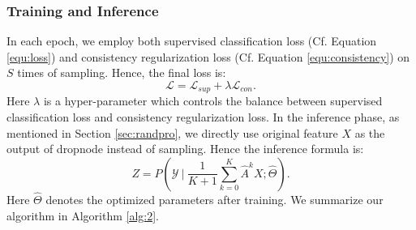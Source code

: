 {\subsubsection{Training and Inference}
In each epoch, we employ both supervised classification loss (Cf. Equation \ref{equ:loss}) and consistency regularization loss (Cf. Equation \ref{equ:consistency}) on $S$ times of sampling. Hence, the final loss is:
\begin{equation}
\label{equ:inf}
	\mathcal{L} = \mathcal{L}_{sup} + \lambda \mathcal{L}_{con}.
\end{equation}
Here $\lambda$ is a hyper-parameter which controls the balance between supervised classification loss and consistency regularization loss.
In the inference phase, as mentioned in Section \ref{sec:randpro}, we directly use original feature $X$ as the output of dropnode instead of sampling. Hence the inference formula is:
\begin{equation}
\label{equ:inference}
Z= P\left(\mathcal{Y}~\bigg|~\frac{1}{K+1}\sum_{k=0}^K\hat{A}^k X;\hat{\Theta}\right).
\end{equation}
Here $\hat{\Theta}$ denotes the optimized parameters after training. We summarize our algorithm in Algorithm \ref{alg:2}. 


 
}
